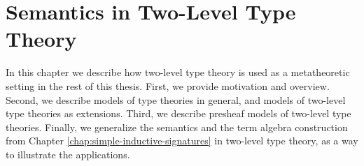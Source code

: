 \documentclass[12pt,a4paper,twoside,openany]{book}
\theoremstyle{remark}
\theoremstyle{definition}
\theoremstyle{theorem}
\newcommand{\ms}[1]{\mathsf{#1}}
\newcommand{\refl}{\mathsf{refl}}
\newcommand{\Con}{\mathsf{Con}}
\newcommand{\Tm}{\mathsf{Tm}}
\newcommand{\Rec}{\ms{Rec}}
\newcommand{\Ind}{\ms{Ind}}
\begin{document}




\chapter{Semantics in Two-Level Type Theory}
\label{chap:2ltt}

In this chapter we describe how two-level type theory is used as a metatheoretic
setting in the rest of this thesis. First, we provide motivation and
overview. Second, we describe models of type theories in general, and models of
two-level type theories as extensions. Third, we describe presheaf models of
two-level type theories. Finally, we generalize the semantics and the term
algebra construction from Chapter \ref{chap:simple-inductive-signatures} in
two-level type theory, as a way to illustrate the applications.
\end{document}
